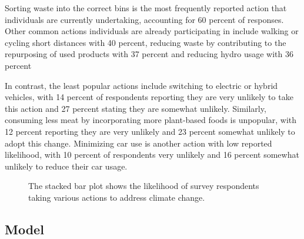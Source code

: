 \documentclass[
  letterpaper,
  DIV=11,
  numbers=noendperiod]{scrartcl}
\begin{document}
Sorting waste into the correct bins is the most frequently reported
action that individuals are currently undertaking, accounting for 60
percent of responses. Other common actions individuals are already
participating in include walking or cycling short distances with 40
percent, reducing waste by contributing to the repurposing of used
products with 37 percent and reducing hydro usage with 36 percent

In contrast, the least popular actions include switching to electric or
hybrid vehicles, with 14 percent of respondents reporting they are very
unlikely to take this action and 27 percent stating they are somewhat
unlikely. Similarly, consuming less meat by incorporating more
plant-based foods is unpopular, with 12 percent reporting they are very
unlikely and 23 percent somewhat unlikely to adopt this change.
Minimizing car use is another action with low reported likelihood, with
10 percent of respondents very unlikely and 16 percent somewhat unlikely
to reduce their car usage.

\begin{figure}


\caption{\label{fig-nine}The stacked bar plot shows the likelihood of
survey respondents taking various actions to address climate change.}

\end{figure}%

\subsection{Model}\label{sec-model}
\end{document}

